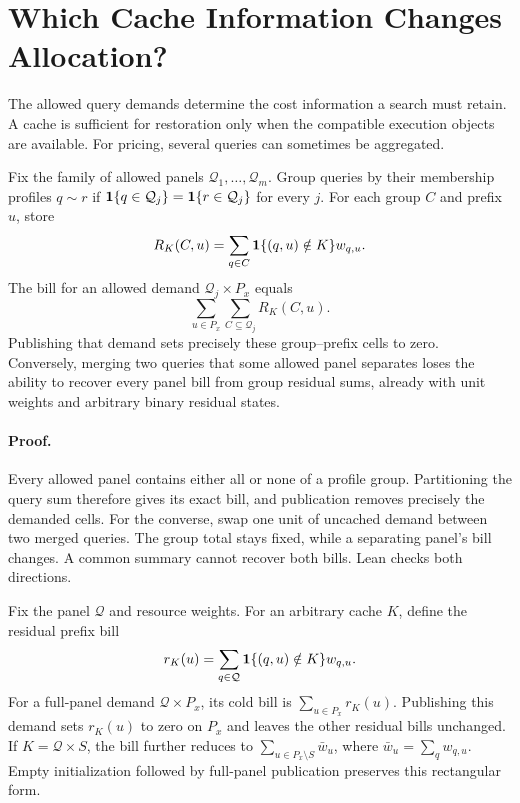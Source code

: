 \section{Which Cache Information Changes Allocation?}
\label{sec:graph-information}
The allowed query demands determine the cost information a search must retain.
A cache is sufficient for restoration only when the compatible execution objects
are available. For pricing, several queries can sometimes be aggregated.

\begin{theorem}
\label{thm:demand-quotient}
Fix the family of allowed panels $\mathcal Q_1,\ldots,\mathcal Q_m$.
Group queries by their membership profiles
$q\sim r$ if $\mathbf{1}\{q\in\mathcal Q_j\}=\mathbf{1}\{r\in\mathcal Q_j\}$ for every $j$.
For each group $C$ and prefix $u$, store
\begin{equation}
 R_K(C,u)=\sum_{q\in C}\mathbf{1}\{(q,u)\notin K\}w_{q,u}.
 \label{eq:group-residual}
\end{equation}
The bill for an allowed demand $\mathcal Q_j\times P_x$ equals
\[
 \sum_{u\in P_x}\sum_{C\subseteq\mathcal Q_j}R_K(C,u).
\]
Publishing that demand sets precisely these group--prefix cells to zero.
Conversely, merging two queries that some allowed panel separates loses the
ability to recover every panel bill from group residual sums, already with
unit weights and arbitrary binary residual states.
\end{theorem}

\paragraph{Proof.}
Every allowed panel contains either all or none of a profile group. Partitioning
the query sum therefore gives its exact bill, and publication removes precisely
the demanded cells. For the converse, swap one unit of uncached demand between
two merged queries. The group total stays fixed, while a separating panel's bill
changes. A common summary cannot recover both bills. Lean checks both directions.

\begin{proposition}
\label{prop:graph-compression}
Fix the panel $\mathcal Q$ and resource weights. For an arbitrary cache $K$, define the residual prefix bill
\begin{equation}
 r_K(u)=\sum_{q\in\mathcal Q}\mathbf{1}\{(q,u)\notin K\}w_{q,u}.
 \label{eq:residual-prefix}
\end{equation}
For a full-panel demand $\mathcal Q\times P_x$, its cold bill is $\sum_{u\in P_x}r_K(u)$. Publishing this demand sets $r_K(u)$ to zero on $P_x$ and leaves the other residual bills unchanged. If $K=\mathcal Q\times S$, the bill further reduces to $\sum_{u\in P_x\setminus S}\bar w_u$, where $\bar w_u=\sum_qw_{q,u}$. Empty initialization followed by full-panel publication preserves this rectangular form.
\end{proposition}

